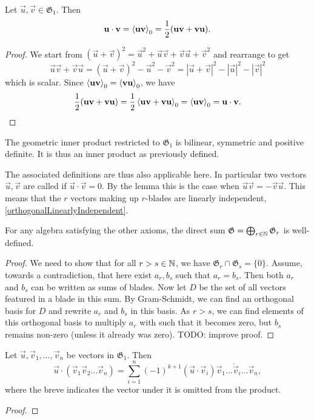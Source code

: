 \begin{lemma}
Let $\vec{u}, \vec{v} \in \mathfrak{G}_1$. Then
\[ \boldsymbol{\mathrm{u}}\cdot \boldsymbol{\mathrm{v}} = \left\langle \boldsymbol{\mathrm{u}}\boldsymbol{\mathrm{v}} \right\rangle_0 = \frac{1}{2}(\boldsymbol{\mathrm{u}}\boldsymbol{\mathrm{v}} + \boldsymbol{\mathrm{v}}\boldsymbol{\mathrm{u}}). \]
\end{lemma}
\begin{proof}
We start from $(\vec{u}+\vec{v})^2 = \vec{u}^2 + \vec{u}\vec{v} + \vec{v}\vec{u} + \vec{v}^2$ and rearrange to get
\[ \vec{u}\vec{v} + \vec{v}\vec{u} = (\vec{u}+\vec{v})^2 - \vec{u}^2 - \vec{v}^2 = |\vec{u}+\vec{v}|^2 - |\vec{u}|^2 - |\vec{v}|^2  \]
which is scalar. Since $\left\langle \boldsymbol{\mathrm{u}}\boldsymbol{\mathrm{v}} \right\rangle_0 = \left\langle \boldsymbol{\mathrm{v}}\boldsymbol{\mathrm{u}} \right\rangle_0$, we have
\[ \frac{1}{2}(\boldsymbol{\mathrm{u}}\boldsymbol{\mathrm{v}} + \boldsymbol{\mathrm{v}}\boldsymbol{\mathrm{u}}) = \frac{1}{2}\left\langle \boldsymbol{\mathrm{u}}\boldsymbol{\mathrm{v}} + \boldsymbol{\mathrm{v}}\boldsymbol{\mathrm{u}} \right\rangle_0 = \left\langle \boldsymbol{\mathrm{u}}\boldsymbol{\mathrm{v}} \right\rangle_0 = \boldsymbol{\mathrm{u}}\cdot \boldsymbol{\mathrm{v}}. \]
\end{proof}
\begin{corollary}
The geometric inner product restricted to $\mathfrak{G}_1$ is bilinear, symmetric and positive definite. It is thus an inner product as previously defined.
\end{corollary}
The associated definitions are thus also applicable here. In particular two vectors $\vec{u},\vec{v}$ are called  if $\vec{u}\cdot \vec{v} = 0$. By the lemma this is the case when $\vec{u}\vec{v} = - \vec{v}\vec{u}$. This means that the $r$ vectors making up $r$-blades are linearly independent, \ref{orthogonalLinearlyIndependent}.




\begin{lemma}
For any algebra satisfying the other axioms, the direct sum $\mathfrak{G} = \bigoplus_{r\in\mathbb{N}}\mathfrak{G}_r$ is well-defined.
\end{lemma}
\begin{proof}
We need to show that for all $r>s\in \mathbb{N}$, we have $\mathfrak{G}_r\cap\mathfrak{G}_s = \{0\}$. Assume, towards a contradiction, that here exist $a_r,b_s$ such that $a_r = b_s$. Then both $a_r$ and $b_s$ can be written as sums of blades. Now let $D$ be the set of all vectors featured in a blade in this sum. By Gram-Schmidt, we can find an orthogonal basis for $D$ and rewrite $a_r$ and $b_s$ in this basis. As $r>s$, we can find elements of this orthogonal basis to multiply $a_r$ with such that it becomes zero, but $b_s$ remains non-zero (unless it already was zero). TODO: improve proof.
\end{proof}


\begin{lemma}
Let $\vec{u}, \vec{v}_1,\ldots, \vec{v}_n$ be vectors in $\mathfrak{G}_1$. Then
\[ \vec{u}\cdot (\vec{v}_1 \vec{v}_2 \ldots \vec{v}_n) = \sum_{i=1}^n (-1)^{k+1}(\vec{u}\cdot \vec{v}_i)\vec{v}_1\ldots\breve{\vec{v}}_i\ldots \vec{v}_n, \]
where the breve indicates the vector under it is omitted from the product.
\end{lemma}
\begin{proof}

\end{proof}

